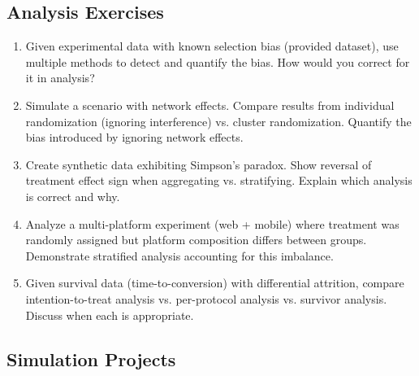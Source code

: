 \subsection{Analysis Exercises}

\begin{enumerate}
    \item Given experimental data with known selection bias (provided dataset), use multiple methods to detect and quantify the bias. How would you correct for it in analysis?

    \item Simulate a scenario with network effects. Compare results from individual randomization (ignoring interference) vs. cluster randomization. Quantify the bias introduced by ignoring network effects.

    \item Create synthetic data exhibiting Simpson's paradox. Show reversal of treatment effect sign when aggregating vs. stratifying. Explain which analysis is correct and why.

    \item Analyze a multi-platform experiment (web + mobile) where treatment was randomly assigned but platform composition differs between groups. Demonstrate stratified analysis accounting for this imbalance.

    \item Given survival data (time-to-conversion) with differential attrition, compare intention-to-treat analysis vs. per-protocol analysis vs. survivor analysis. Discuss when each is appropriate.
\end{enumerate}

\subsection{Simulation Projects}

